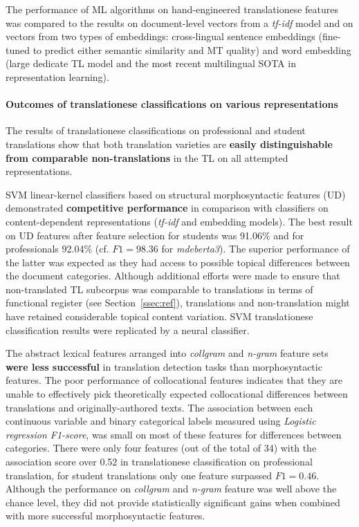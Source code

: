 The performance of ML algorithms on hand-engineered translationese features was compared to the results on document-level vectors from a \textit{tf-idf} model and on vectors from two types of embeddings: cross-lingual sentence embeddings (fine-tuned to predict either semantic similarity and MT quality) and word embedding (large dedicate TL model and the most recent multilingual SOTA in representation learning). 

\paragraph{Outcomes of translationese classifications on various representations} 
The results of translationese classifications on professional and student translations show that both translation varieties are \textbf{easily distinguishable from comparable non-translations} in the TL on all attempted representations. 

SVM linear-kernel classifiers based on structural morphosyntactic features (UD) demonstrated \textbf{competitive performance} in comparison with classifiers on content-dependent representations (\textit{tf-idf} and embedding models). 
The best result on UD features after feature selection for students was 91.06\% and for professionals 92.04\% (cf. $F1=98.36$ for \textit{mdeberta3}).
The superior performance of the latter was expected as they had access to possible topical differences between the document categories. Although additional efforts were made to ensure that non-translated TL subcorpus was comparable to translations in terms of functional register (see Section~\ref{ssec:ref}), translations and non-translation might have retained considerable topical content variation. SVM translationese classification results were replicated by a neural classifier.

The abstract lexical features arranged into \textit{collgram} and \textit{n-gram} feature sets \textbf{were less successful} in translation detection tasks than morphosyntactic features. 
The poor performance of collocational features indicates that they are unable to effectively pick theoretically expected collocational differences between translations and originally-authored texts. The association between each continuous variable and binary categorical labels measured using \textit{Logistic regression F1-score}, was small on most of these features for differences between categories. There were only four features (out of the total of 34) with the association score over 0.52 in translationese classification on professional translation, for student translations only one feature surpassed $F1=0.46$. Although the performance on \textit{collgram} and \textit{n-gram} feature was well above the chance level, they did not provide statistically significant gains when combined with more successful morphosyntactic features. 

